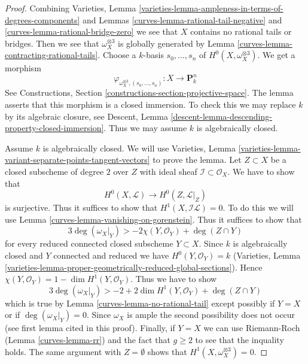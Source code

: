 \begin{proof}

Combining Varieties, Lemma
\ref{varieties-lemma-ampleness-in-terms-of-degrees-components} and
Lemmas \ref{curves-lemma-rational-tail-negative} and \ref{curves-lemma-rational-bridge-zero}
we see that $X$ contains no rational tails or bridges.
Then we see that $\omega_X^{\otimes 3}$ is globally generated
by Lemma \ref{curves-lemma-contracting-rational-tails}.
Choose a $k$-basis $s_0, \ldots, s_n$ of
$H^0(X, \omega_X^{\otimes 3})$. We get a morphism
$$
\varphi_{\omega_X^{\otimes 3}, (s_0, \ldots, s_n)} :
X \longrightarrow \mathbf{P}^n_k
$$
See Constructions, Section \ref{constructions-section-projective-space}.
The lemma asserts that this morphism is a closed immersion.
To check this we may replace $k$ by its algebraic closure, see
Descent, Lemma \ref{descent-lemma-descending-property-closed-immersion}.
Thus we may assume $k$ is algebraically closed.

\medskip\noindent
Assume $k$ is algebraically closed.
We will use Varieties, Lemma
\ref{varieties-lemma-variant-separate-points-tangent-vectors}
to prove the lemma.
Let $Z \subset X$ be a closed subscheme of degree $2$ over $Z$
with ideal sheaf $\mathcal{I} \subset \mathcal{O}_X$.
We have to show that
$$
H^0(X, \mathcal{L}) \to H^0(Z, \mathcal{L}|_Z)
$$
is surjective. Thus it suffices to show that
$H^1(X, \mathcal{I}\mathcal{L}) = 0$.
To do this we will use Lemma \ref{curves-lemma-vanishing-on-gorenstein}.
Thus it suffices to show that
$$
3\deg(\omega_X|_Y) > -2\chi(Y, \mathcal{O}_Y) + \deg(Z \cap Y)
$$
for every reduced connected closed subscheme $Y \subset X$.
Since $k$ is algebraically closed and $Y$ connected and reduced
we have $H^0(Y, \mathcal{O}_Y) = k$ (Varieties, Lemma
\ref{varieties-lemma-proper-geometrically-reduced-global-sections}).
Hence $\chi(Y, \mathcal{O}_Y) = 1 - \dim H^1(Y, \mathcal{O}_Y)$.
Thus we have to show
$$
3\deg(\omega_X|_Y) > -2 + 2\dim H^1(Y, \mathcal{O}_Y) + \deg(Z \cap Y)
$$
which is true by Lemma \ref{curves-lemma-no-rational-tail}
except possibly if $Y = X$ or if $\deg(\omega_X|_Y) = 0$.
Since $\omega_X$ is ample the second possibility does not
occur (see first lemma cited in this proof). Finally, if
$Y = X$ we can use Riemann-Roch (Lemma \ref{curves-lemma-rr})
and the fact that $g \geq 2$ to see that the inquality holds.
The same argument with $Z = \emptyset$ shows that
$H^1(X, \omega_X^{\otimes 3}) = 0$.
\end{proof}

